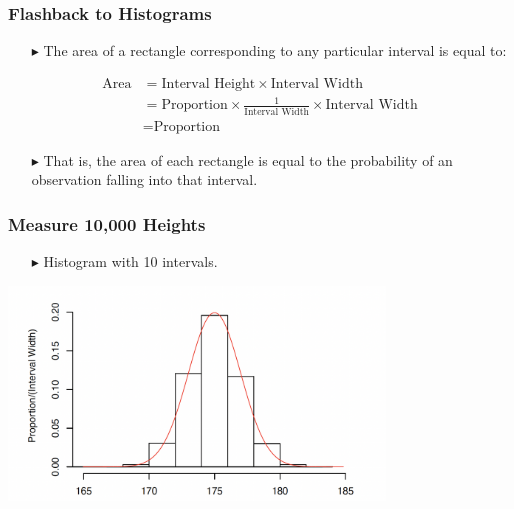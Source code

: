 \documentclass[12pt]{beamer}
\begin{document}
\begin{frame}
	\frametitle{Flashback to Histograms}
	
	\begin{itemize}
		\item[\color{blue}$\blacktriangleright$] The area of a rectangle corresponding to any particular interval is equal to:
	\end{itemize}
	
	\vspace{0.5cm}
	
	\begin{align*}
		\text{Area} &= \text{Interval Height} \times \text{Interval Width} \\[0.5em]
		&= \text{Proportion} \times \frac{1}{\text{Interval Width}} \times \text{Interval Width} \\[0.5em]
		&= \text{Proportion}
	\end{align*}
	
	\vspace{0.5cm}
	
	\begin{itemize}
		\item[\color{blue}$\blacktriangleright$] That is, the area of each rectangle is equal to the probability of an observation falling into that interval.
	\end{itemize}
	
\end{frame}
\begin{frame}
	\frametitle{Measure 10,000 Heights}
		\begin{itemize}
		\item[\color{blue}$\blacktriangleright$] Histogram with 10 intervals.
	\end{itemize}
	\centering
	\includegraphics[width=10cm]{histo.png}
\end{frame}
\end{document}
